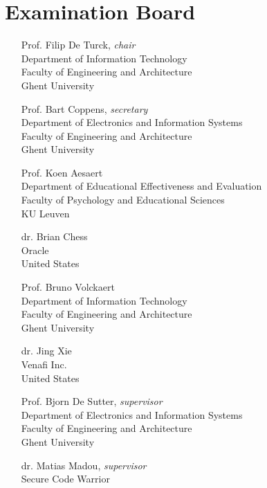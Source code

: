 \chapter*{Examination Board}

{
  \small

  \begin{itemize}

    \item[Prof.] Filip De Turck, \emph{chair} \\
      Department of Information Technology\\
      Faculty of Engineering and Architecture\\
      Ghent University
      
    \item[Prof.] Bart Coppens, \emph{secretary}\\
      Department of Electronics and Information Systems\\
      Faculty of Engineering and Architecture\\
      Ghent University
      
    \item[Prof.] Koen Aesaert\\
      Department of Educational Effectiveness and Evaluation\\
      Faculty of Psychology and Educational Sciences\\
      KU Leuven
      
    \item[dr.] Brian Chess\\
      Oracle\\
      United States
      
    \item[Prof.] Bruno Volckaert\\
      Department of Information Technology\\
      Faculty of Engineering and Architecture\\
      Ghent University

    \item[dr.] Jing Xie\\
      Venafi Inc.\\
      United States
      
    \item[Prof.] Bjorn De Sutter, \emph{supervisor} \\
      Department of Electronics and Information Systems\\
      Faculty of Engineering and Architecture\\
      Ghent University

    \item[dr.] Matias Madou, \emph{supervisor} \\
      Secure Code Warrior
        
  \end{itemize}
}

\cleardoublepage